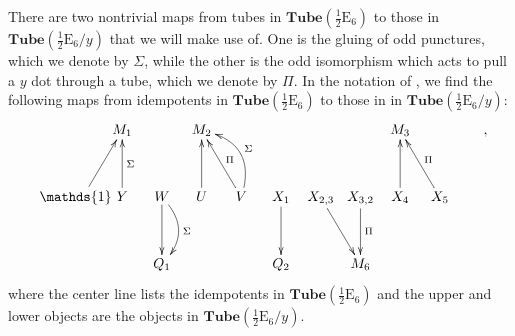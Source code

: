 \documentclass[12pt,a4paper]{article}
\newcounter{arrow}
\newcommand{\tube}{\textbf{Tube}}
\newcommand{\halfesix}{\frac{1}{2}\text{E}_6}
\begin{document}
There are two nontrivial maps from tubes in $\tube(\halfesix)$ to those in $\tube(\halfesix / y)$ that we will make use of. 
One is the gluing of odd punctures, which we denote by $\Sigma$, while 
the other is the odd isomorphism which acts to pull a $y$ dot through a tube, which we denote by $\Pi$. 
In the notation of \cite{Hong2008}, we find the following maps from idempotents in $\tube(\halfesix)$ to those in in $\tube(\halfesix / y)$:
\begin{align}
\xymatrix @!0 @M=1mm @C=10mm{
& &M_1 && M_2 && &&& M_3 &&  \\
 \\
 \quad&\mathds{1} \ar[ruu] \quad & Y \ar[uu]_{\Sigma} & W\ar[dd] \ar@/^1pc/[dd]^{\Sigma} & U\ar[uu] & V \ar[uul]_\Pi \ar@/_1.3pc/[uul]_\Sigma & X_1 \ar[dd] & X_{2,3}\ar[ddr] &X_{3,2} \ar[dd]^\Pi& X_4\ar[uu] & X_5\ar[uul]_\Pi &  \\
\\
&&&Q_1& &&Q_2 &&M_6& &&  \\
},
\end{align}
where the center line lists the idempotents in $\tube(\halfesix)$ and the upper and lower objects are the objects in $\tube(\halfesix / y)$.
\end{document}
